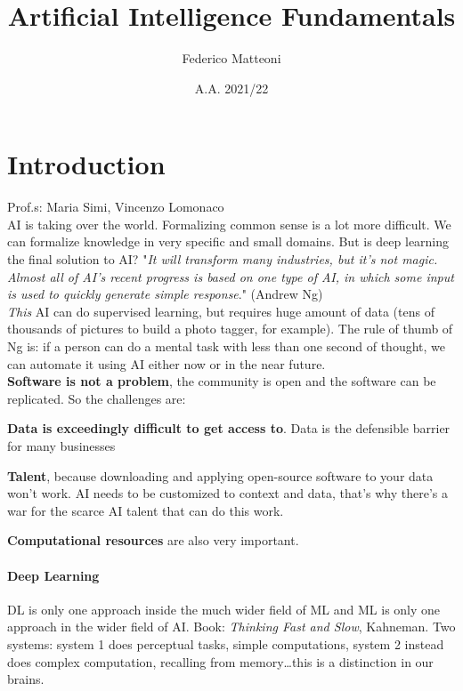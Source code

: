 \documentclass[10pt]{report}
\begin{document}
\title{Artificial Intelligence Fundamentals}
\author{Federico Matteoni}
\date{A.A. 2021/22}
\renewcommand*\contentsname{Index}
\maketitle
\tableofcontents
\pagebreak
\section{Introduction}
Prof.s: Maria Simi, Vincenzo Lomonaco\\
AI is taking over the world. Formalizing common sense is a lot more difficult. We can formalize knowledge in very specific and small domains. But is deep learning the final solution to AI? "\textit{It will transform many industries, but it's not magic. Almost all of AI's recent progress is based on one type of AI, in which some input is used to quickly generate simple response}." (Andrew Ng)\\
\textit{This} AI can do supervised learning, but requires huge amount of data (tens of thousands of pictures to build a photo tagger, for example). The rule of thumb of Ng is: if a person can do a mental task with less than one second of thought, we can automate it using AI either now or in the near future.\\
\textbf{Software is not a problem}, the community is open and the software can be replicated. So the challenges are:
\begin{list}{}{}
	\item \textbf{Data is exceedingly difficult to get access to}. Data is the defensible barrier for many businesses
	\item \textbf{Talent}, because downloading and applying open-source software to your data won't work. AI needs to be customized to context and data, that's why there's a war for the scarce AI talent that can do this work.
	\item \textbf{Computational resources} are also very important.
\end{list}
\paragraph{Deep Learning} DL is only one approach inside the much wider field of ML and ML is only one approach in the wider field of AI. Book: \textit{Thinking Fast and Slow}, Kahneman. Two systems: system 1 does perceptual tasks, simple computations, system 2 instead does complex computation, recalling from memory\ldots this is a distinction in our brains.
\end{document}
